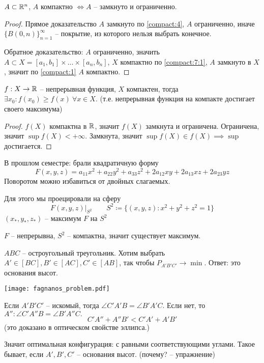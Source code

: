\documentclass[main]{subfiles}
\begin{document}
\begin{theorem}
    $A \subset \mathbb{R}^n$, $A$ компактно $\Leftrightarrow A$ -- замкнуто и ограниченно.
\end{theorem}
\begin{proof}
    Прямое доказательство $A$ замкнуто по \ref{compact:4}, $A$ ограниченно, иначе  $\{B(0, n)\}_{n=1}^\infty$ -- покрытие,
    из которого нельзя выбрать конечное.

    Обратное доказательство: $A$ ограниченно, значить $A \subset X = [a_1, b_1] \times ... \times [a_n, b_n]$,
    $X$ компактно по \ref{compact:7:1}, $A$ замкнуто в $X$, значит по \ref{compact:1} $A$ компактно.
\end{proof}

\begin{theorem}\label{compact:8}
    $f: X \to \mathbb{R}$ -- непрерывная функция, $X$ компактен, тогда $\exists x_0: f(x_0) \ge f(x)\ \forall x \in X$.
    (т.е. непрерывная функция на компакте достигает своего максимума)
\end{theorem}
\begin{proof}
    $f(X)$ компактна в $\mathbb{R}$, значит $f(X)$ замкнута и ограничена. Ограничена, значит $\sup f(X) < + \infty$.
    Замкнута, значит $\sup f(X) \in f(X) \implies \sup$ достигается.
\end{proof}

\begin{example}
    В прошлом семестре: брали квадратичную форму
    \[F(x,y,z) = a_{11} x^2 + a_{22}y^2 + a_{33} z^2 + 2 a_{12} xy + 2 a_{13} xz + 2 a_{23}yz\]
    Поворотом можно избавиться от двойных слагаемых.

    Для этого мы проецировали на сферу
    \[F(x,y,z)\rvert_{S^2} \qquad S^2 \coloneqq \{(x,y,z): x^2+y^2+z^2 = 1\}\]
    $(x_*, y_*, z_*)$ -- максимум $F$ на $S^2$

    $F$ -- непрерывна, $S^2$ -- компактна, значит существует максимум.
\end{example}

\begin{example}
    $ABC$ -- остроугольный треугольник.
    Хотим выбрать $A' \in [BC], B' \in [AC], C' \in [AB]$,
    так чтобы $P_{A'B'C'} \to \min$.
    Ответ: это основания высот.
    \begin{center}
        \texttt{[image: fagnanos\_problem.pdf]}
    \end{center}
    Если $A'B'C'$ -- искомый, тогда $\angle C'A'B = \angle B'A'C$.
    Если нет, то $A'': \angle C'A''B = \angle B'A''C.$
    \[C'A'' + A''B' < C'A' + A'B'\]
    (это доказано в оптическом свойстве эллипса.)

    Значит оптимальная конфигурация: с равными соответствующими углами.
    Такое бывает, если $A',B',C'$ -- основания высот. (почему? -- упражнение)
\end{example}
\end{document}
